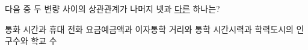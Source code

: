 다음 중 두 변량 사이의 상관관계가 나머지 넷과 \underline{다른} 하나는?
\begin{choicesii}{통화 시간과 휴대 전화 요금}{예금액과 이자}{통학 거리와 통학 시간}{시력과 학력}{도시의 인구수와 학교 수}\end{choicesii}
